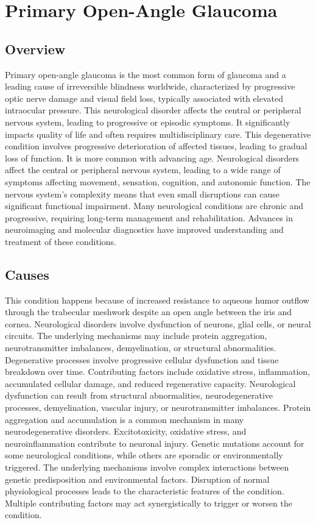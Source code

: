 \chapter{Primary Open-Angle Glaucoma}
\label{sec:Primary Open-Angle Glaucoma}

\section{Overview}
Primary open-angle glaucoma is the most common form of glaucoma and a leading cause of irreversible blindness worldwide, characterized by progressive optic nerve damage and visual field loss, typically associated with elevated intraocular pressure. This neurological disorder affects the central or peripheral nervous system, leading to progressive or episodic symptoms. It significantly impacts quality of life and often requires multidisciplinary care. This degenerative condition involves progressive deterioration of affected tissues, leading to gradual loss of function. It is more common with advancing age. Neurological disorders affect the central or peripheral nervous system, leading to a wide range of symptoms affecting movement, sensation, cognition, and autonomic function. The nervous system's complexity means that even small disruptions can cause significant functional impairment. Many neurological conditions are chronic and progressive, requiring long-term management and rehabilitation. Advances in neuroimaging and molecular diagnostics have improved understanding and treatment of these conditions.
\section{Causes}
This condition happens because of increased resistance to aqueous humor outflow through the trabecular meshwork despite an open angle between the iris and cornea. Neurological disorders involve dysfunction of neurons, glial cells, or neural circuits. The underlying mechanisms may include protein aggregation, neurotransmitter imbalances, demyelination, or structural abnormalities. Degenerative processes involve progressive cellular dysfunction and tissue breakdown over time. Contributing factors include oxidative stress, inflammation, accumulated cellular damage, and reduced regenerative capacity. Neurological dysfunction can result from structural abnormalities, neurodegenerative processes, demyelination, vascular injury, or neurotransmitter imbalances. Protein aggregation and accumulation is a common mechanism in many neurodegenerative disorders. Excitotoxicity, oxidative stress, and neuroinflammation contribute to neuronal injury. Genetic mutations account for some neurological conditions, while others are sporadic or environmentally triggered. The underlying mechanisms involve complex interactions between genetic predisposition and environmental factors. Disruption of normal physiological processes leads to the characteristic features of the condition. Multiple contributing factors may act synergistically to trigger or worsen the condition.
